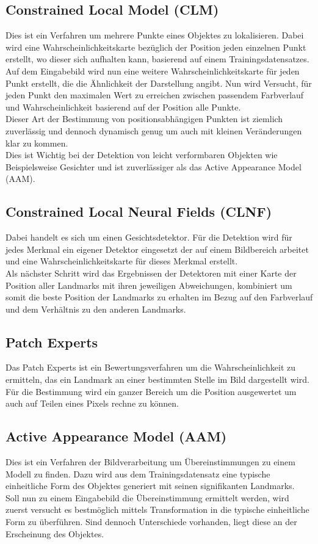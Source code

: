\subsection{Constrained Local Model (CLM)}
Dies ist ein Verfahren um mehrere Punkte eines Objektes zu lokalisieren. Dabei wird eine Wahrscheinlichkeitskarte bezüglich der Position jeden einzelnen Punkt erstellt, wo dieser sich aufhalten kann, basierend auf einem Trainingsdatensatzes. Auf dem Eingabebild wird nun eine weitere Wahrscheinlichkeitskarte für jeden Punkt erstellt, die die Ähnlichkeit der Darstellung angibt. Nun wird Versucht, für jeden Punkt den maximalen Wert zu erreichen zwischen passendem Farbverlauf und Wahrscheinlichkeit basierend auf der Position alle Punkte.\\
Dieser Art der Bestimmung von positionsabhängigen Punkten ist ziemlich zuverlässig und dennoch dynamisch genug um auch mit kleinen Veränderungen klar zu kommen.\\
Dies ist Wichtig bei der Detektion von leicht verformbaren Objekten wie Beispielsweise Gesichter und ist zuverlässiger als das Active Appearance Model (AAM).\\
\cite{pdf_CLM}
\subsection{Constrained Local Neural Fields (CLNF)}
Dabei handelt es sich um einen Gesichtsdetektor. Für die Detektion wird für jedes Merkmal ein eigener Detektor eingesetzt der auf einem Bildbereich arbeitet und eine Wahrscheinlichkeitskarte für dieses Merkmal erstellt.\\
Als nächster Schritt wird das Ergebnissen der Detektoren mit einer Karte der Position aller Landmarks mit ihren jeweiligen Abweichungen, kombiniert um somit die beste Position der Landmarks zu erhalten im Bezug auf den Farbverlauf und dem Verhältnis zu den anderen Landmarks.\\
\cite{CLNF}
\subsection{Patch Experts}
Das Patch Experts ist ein Bewertungsverfahren um die Wahrscheinlichkeit zu ermitteln, das ein Landmark an einer bestimmten Stelle im Bild dargestellt wird. Für die Bestimmung wird ein ganzer Bereich um die Position ausgewertet um auch auf Teilen eines Pixels rechne zu können.\\
\cite{CLNF}
\subsection{Active Appearance Model (AAM)}
Dies ist ein Verfahren der Bildverarbeitung um Übereinstimmungen zu einem Modell zu finden. Dazu wird aus dem Trainingsdatensatz eine typische einheitliche Form des Objektes generiert mit seinen signifikanten Landmarks.\\
Soll nun zu einem Eingabebild die Übereinstimmung ermittelt werden, wird zuerst versucht es bestmöglich mittels Transformation in die typische einheitliche Form zu überführen. Sind dennoch Unterschiede vorhanden, liegt diese an der Erscheinung des Objektes.\\
\cite{wiki_AAM}
